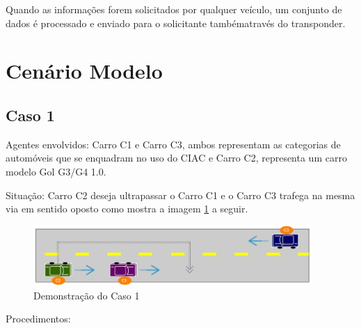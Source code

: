 Quando as informações forem
solicitados por qualquer veículo, um conjunto de dados é processado e enviado
para o solicitante tambématravés do transponder.

\section{Cenário Modelo}

\subsection{Caso 1}

Agentes envolvidos: Carro C1 e Carro C3, ambos representam as categorias de
automóveis que se enquadram no uso do CIAC e Carro C2, representa um carro
modelo Gol G3/G4 1.0.

Situação: Carro C2 deseja ultrapassar o Carro C1 e o Carro C3 trafega na mesma
via em sentido oposto como mostra a imagem \ref{fig:caso1} a seguir.

\begin{figure}[h]
  \centering
  \includegraphics[width=400px, scale=1]{figuras/caso1}
  \caption{Demonstração do Caso 1}
\label{fig:caso1}
\end{figure}

Procedimentos:


